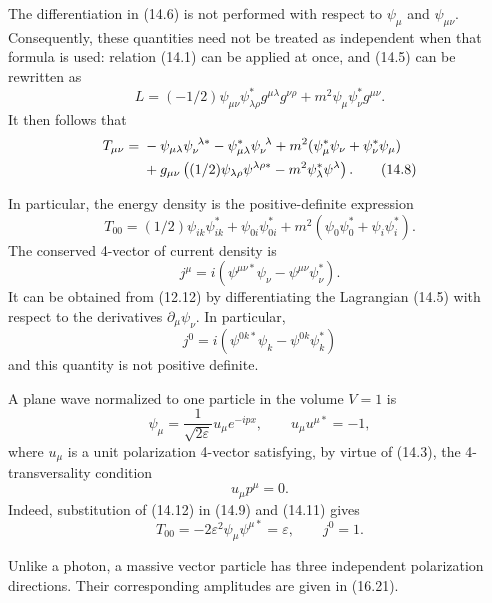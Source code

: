 The differentiation in (14.6) is not performed with respect to $\psi_\mu$ and $\psi_{\mu\nu}$. Consequently, these quantities need not be treated as independent when that formula is used: relation (14.1) can be applied at once, and (14.5) can be rewritten as
\begin{equation}
L=(-1/2)\psi_{\mu\nu}\psi^*_{\lambda\rho}g^{\mu\lambda}g^{\nu\rho}
+m^2\psi_\mu\psi^*_\nu g^{\mu\nu}.
\tag{14.7}
\end{equation}
It then follows that
\begin{align}
T_{\mu\nu}={}&-\psi_{\mu\lambda}\psi_\nu^{\ \lambda*}
-\psi^*_{\mu\lambda}\psi_\nu^{\ \lambda}
+m^2(\psi^*_\mu\psi_\nu+\psi^*_\nu\psi_\mu)
\notag\\
&+g_{\mu\nu}\left((1/2)\psi_{\lambda\rho}\psi^{\lambda\rho*}
-m^2\psi^*_\lambda\psi^\lambda\right).
\tag{14.8}
\end{align}

In particular, the energy density is the positive-definite expression
\begin{equation}
T_{00}=(1/2)\psi_{ik}\psi^*_{ik}+\psi_{0i}\psi^*_{0i}
+m^2(\psi_0\psi^*_0+\psi_i\psi^*_i).
\tag{14.9}
\end{equation}
The conserved 4-vector of current density is
\begin{equation}
j^\mu=i(\psi^{\mu\nu*}\psi_\nu-\psi^{\mu\nu}\psi^*_\nu).
\tag{14.10}
\end{equation}
It can be obtained from (12.12) by differentiating the Lagrangian (14.5) with respect to the derivatives $\partial_\mu\psi_\nu$. In particular,
\begin{equation}
j^0=i(\psi^{0k*}\psi_k-\psi^{0k}\psi^*_k)
\tag{14.11}
\end{equation}
and this quantity is not positive definite.

A plane wave normalized to one particle in the volume $V=1$ is
\begin{equation}
\psi_\mu=\frac{1}{\sqrt{2\varepsilon}}u_\mu e^{-ipx},
\qquad
u_\mu u^{\mu*}=-1,
\tag{14.12}
\end{equation}
where $u_\mu$ is a unit polarization 4-vector satisfying, by virtue of (14.3), the 4-transversality condition
\begin{equation}
u_\mu p^\mu=0.
\tag{14.13}
\end{equation}
Indeed, substitution of (14.12) in (14.9) and (14.11) gives
\[
T_{00}=-2\varepsilon^2\psi_\mu\psi^{\mu*}=\varepsilon,
\qquad
j^0=1.
\]

Unlike a photon, a massive vector particle has three independent polarization directions. Their corresponding amplitudes are given in (16.21).

